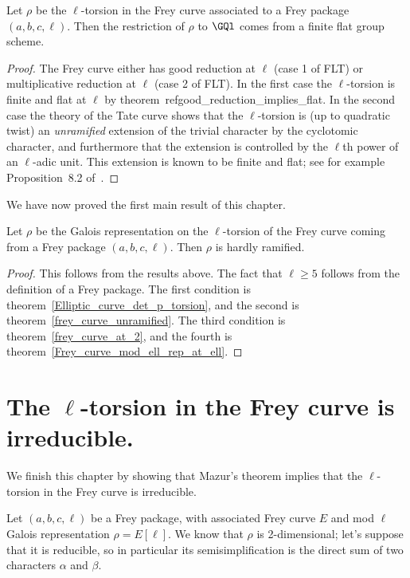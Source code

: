 \begin{theorem}\label{Frey_curve_mod_ell_rep_at_ell} Let $\rho$ be the $\ell$-torsion in the
  Frey curve associated to a Frey package $(a,b,c,\ell)$. Then the restriction of $\rho$ to $\GQl$ comes from a finite flat group scheme.
\end{theorem}
\begin{proof} The Frey curve either has good reduction at $\ell$ (case 1 of FLT) or multiplicative reduction at $\ell$ (case 2 of FLT). In the first case the $\ell$-torsion is finite and flat
  at $\ell$ by theorem~ref{good_reduction_implies_flat}. In the second case the theory of the Tate curve shows that the $\ell$-torsion is (up to quadratic twist) an \emph{unramified} extension of the trivial character by the cyclotomic character, and furthermore that the extension is controlled
  by the $\ell$th power of an $\ell$-adic unit. This extension is known to be finite and flat;
  see for example Proposition~8.2 of~\cite{edix}.
\end{proof}

We have now proved the first main result of this chapter.

\begin{theorem}\label{frey_curve_hardly_ramified} Let $\rho$ be the Galois representation on the 
  $\ell$-torsion of the Frey curve coming from a Frey package $(a,b,c,\ell)$. Then $\rho$ is hardly 
  ramified.
\end{theorem}
\begin{proof}
  This follows from the results above. The fact that $\ell\geq 5$ follows from the definition of
  a Frey package. The first condition is theorem~\ref{Elliptic_curve_det_p_torsion},
  and the second is theorem~\ref{frey_curve_unramified}. The third condition is
  theorem~\ref{frey_curve_at_2}, and the fourth is theorem~\ref{Frey_curve_mod_ell_rep_at_ell}.
\end{proof}

\section{The $\ell$-torsion in the Frey curve is irreducible.}

We finish this chapter by showing that Mazur's theorem implies that the $\ell$-torsion in the Frey
 curve is irreducible.

Let $(a,b,c,\ell)$ be a Frey package, with associated Frey curve $E$ and mod $\ell$ Galois
 representation $\rho=E[\ell]$. We know that $\rho$ is 2-dimensional; let's suppose that it is
 reducible, so in particular its semisimplification is the direct sum of two characters $\alpha$
 and $\beta$.

